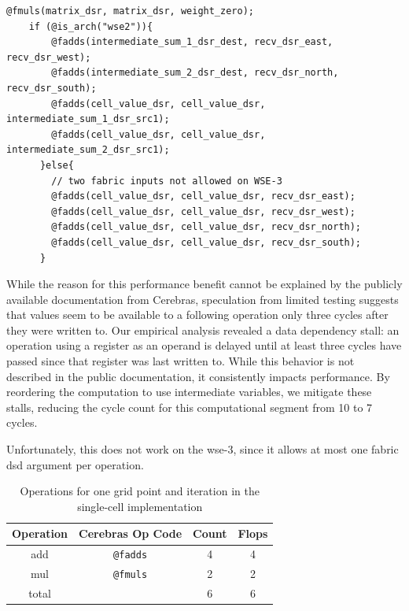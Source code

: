 
\begin{lstlisting}[language=CSL, caption={CSL code for the single-cell implementation}, label={lst:single_cell_implementation}]
    @fmuls(matrix_dsr, matrix_dsr, weight_zero);
    if (@is_arch("wse2")){
        @fadds(intermediate_sum_1_dsr_dest, recv_dsr_east, recv_dsr_west);
        @fadds(intermediate_sum_2_dsr_dest, recv_dsr_north, recv_dsr_south);
        @fadds(cell_value_dsr, cell_value_dsr, intermediate_sum_1_dsr_src1);
        @fadds(cell_value_dsr, cell_value_dsr, intermediate_sum_2_dsr_src1);
      }else{
        // two fabric inputs not allowed on WSE-3
        @fadds(cell_value_dsr, cell_value_dsr, recv_dsr_east);
        @fadds(cell_value_dsr, cell_value_dsr, recv_dsr_west);
        @fadds(cell_value_dsr, cell_value_dsr, recv_dsr_north);
        @fadds(cell_value_dsr, cell_value_dsr, recv_dsr_south);
      }
\end{lstlisting}


While the reason for this performance benefit cannot be explained by the publicly available documentation from Cerebras, speculation from limited testing suggests that values seem to be available to a following operation only three cycles after they were written to.
Our empirical analysis revealed a data dependency stall: an operation using a register as an operand is delayed until at least three cycles have passed since that register was last written to. While this behavior is not described in the public documentation, it consistently impacts performance. By reordering the computation to use intermediate variables, we mitigate these stalls, reducing the cycle count for this computational segment from 10 to 7 cycles.

Unfortunately, this does not work on the \ac{wse}-3, since it allows at most one fabric \ac{dsd} argument per operation.

\begin{table}[h]
    \centering
    \caption{Operations for one grid point and iteration in the single-cell implementation}
    \label{tab:r1_non_tiled_operations}
    \begin{tabular}{@{}cccc@{}}
        \toprule
        Operation & Cerebras Op Code & Count & Flops \\
        \midrule
        add & \texttt{@fadds} & \num{4} & \num{4} \\
        mul & \texttt{@fmuls} & \num{2} & \num{2} \\
        \midrule
        total & & \num{6} & \num{6} \\
        \bottomrule
    \end{tabular}
\end{table}


